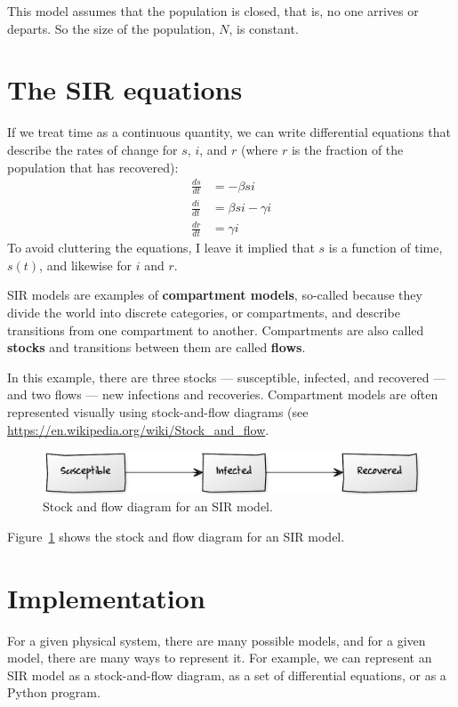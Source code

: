 \documentclass[12pt]{book}
\theoremstyle{exercise}
\begin{document}
This model assumes that the population is closed, that is, no one arrives or departs.  So the size of the population, $N$, is constant.


\section{The SIR equations}

If we treat time as a continuous quantity, we can write differential equations that describe the rates of change for $s$, $i$, and $r$ (where $r$ is the fraction of the population that has recovered):
%
\begin{align*}
\frac{ds}{dt} &= -\beta s i \\
\frac{di}{dt} &= \beta s i - \gamma i\\
\frac{dr}{dt} &= \gamma i
\end{align*}
%
To avoid cluttering the equations, I leave it implied that $s$ is a function of time, $s(t)$, and likewise for $i$ and $r$.

SIR models are examples of {\bf compartment models}, so-called because they divide the world into discrete categories, or compartments, and describe transitions from one compartment to another.  Compartments are also called {\bf stocks} and transitions between them are called {\bf flows}.

In this example, there are three stocks --- susceptible, infected, and recovered --- and two flows --- new infections and recoveries.  Compartment models are often represented visually using stock-and-flow diagrams (see \url{https://en.wikipedia.org/wiki/Stock_and_flow}.

\begin{figure}
\centerline{\includegraphics[width=4.5in]{figs/stock_flow1.pdf}}
\caption{Stock and flow diagram for an SIR model.}
\label{stock_flow1}
\end{figure}

Figure~\ref{stock_flow1} shows the stock and flow diagram for an SIR model.



\section{Implementation}

For a given physical system, there are many possible models, and for a given model, there are many ways to represent it.  For example, we can represent an SIR model as a stock-and-flow diagram, as a set of differential equations, or as a Python program.
\end{document}
